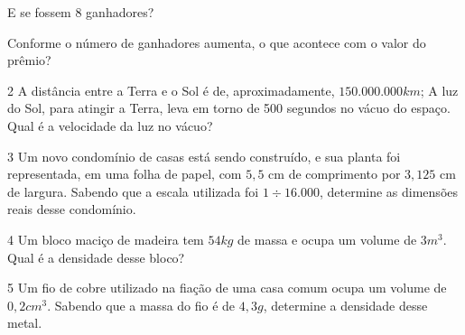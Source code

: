 {{\begin{escolha}[itemsep=0pt]

\item E se fossem 8 ganhadores?


\item Conforme o número de ganhadores aumenta, o que acontece com o valor do prêmio?

\end{escolha}


\num{2} A distância entre a Terra e o Sol é de, aproximadamente, $150.000.000 km$; 
A luz do Sol, para atingir a Terra, leva em torno de 500 segundos no vácuo do espaço.
Qual é a velocidade da luz no vácuo?




\num{3} Um novo condomínio de casas está sendo construído, e sua planta foi
representada, em uma folha de papel, com $5,5$ cm de comprimento por $3,125$
cm de largura. Sabendo que a escala utilizada foi $1 \div 16.000$, determine
as dimensões reais desse condomínio.





\num{4} Um bloco maciço de madeira tem $54 kg$ de massa e ocupa um volume de $3
m^3$. Qual é a densidade desse bloco?





\num{5} Um fio de cobre utilizado na fiação de uma casa comum ocupa um volume
de $0,2 cm^3$. Sabendo que a massa do fio é de $4,3 g$, determine a densidade
desse metal.

}}
